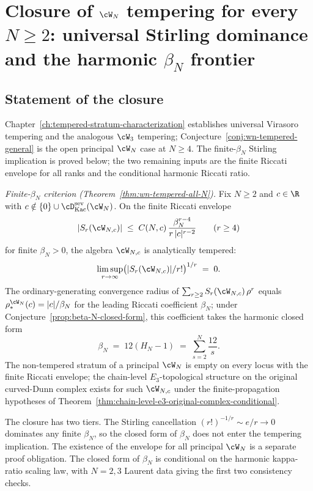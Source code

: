 \chapter{Closure of $\cW_N$ tempering for every $N \ge 2$:
universal Stirling dominance and the harmonic $\beta_N$ frontier}
\label{ch:wn-tempered-closure}

\section*{Statement of the closure}

Chapter~\ref{ch:tempered-stratum-characterization} establishes
universal Virasoro tempering and the analogous $\cW_3$ tempering;
Conjecture~\ref{conj:wn-tempered-general} is the open principal
$\cW_N$ case at $N \ge 4$. The finite-$\beta_N$ Stirling
implication is proved below; the two remaining inputs are the finite
Riccati envelope for all ranks and the conditional harmonic Riccati
ratio.

\emph{Finite-$\beta_N$ criterion (Theorem~\ref{thm:wn-tempered-all-N}).}
Fix $N \ge 2$ and $c \in \R$ with
$c \notin \{0\} \cup \cD^{\mathrm{sev}}_{\mathrm{Kac}}(\cW_N)$. On the
finite Riccati envelope
\[
 \lvert S_r(\cW_{N,c}) \rvert
 \;\le\;
 C(N,c)\,\frac{\beta_N^{r-4}}{r\,|c|^{r-2}}
 \qquad (r\ge 4)
\]
for finite $\beta_N>0$, the algebra $\cW_{N,c}$ is analytically
tempered:
\[
 \limsup_{r \to \infty}
 \bigl(\lvert S_r(\cW_{N,c}) \rvert / r!\bigr)^{1/r}
 \;=\;
 0.
\]
The ordinary-generating convergence radius of
$\sum_{r \ge 2} S_r(\cW_{N,c})\,\rho^r$ equals
$\rho_*^{\cW_N}(c) = \lvert c\rvert / \beta_N$ for the leading
Riccati coefficient $\beta_N$; under
Conjecture~\ref{prop:beta-N-closed-form}, this coefficient takes the
harmonic closed form
\[
 \beta_N \;=\; 12(H_N - 1)
 \;=\; \sum_{s=2}^{N} \frac{12}{s}.
\]
The non-tempered stratum of a principal $\cW_N$ is empty on every
locus with the finite Riccati envelope; the chain-level
$E_3$-topological structure on the original curved-Dunn complex
exists for such $\cW_{N,c}$ under the finite-propagation hypotheses
of Theorem~\ref{thm:chain-level-e3-original-complex-conditional}.

The closure has two tiers. The Stirling cancellation
$(r!)^{-1/r} \sim e/r \to 0$ dominates any finite $\beta_N$, so the
closed form of $\beta_N$ does not enter the tempering implication.
The existence of the envelope for all principal $\cW_N$ is a separate
proof obligation. The closed form of $\beta_N$ is conditional on the
harmonic kappa-ratio scaling law, with $N = 2, 3$ Laurent data giving
the first two consistency checks.

